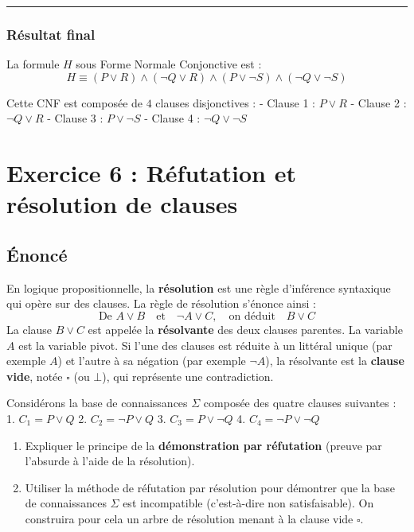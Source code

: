 \documentclass[11pt,a4paper]{article}
\begin{document}
\begin{center}\rule{0.5\linewidth}{0.5pt}\end{center}

\hypertarget{ruxe9sultat-final}{%
\subsubsection{Résultat final}\label{ruxe9sultat-final}}

La formule \(H\) sous Forme Normale Conjonctive est :
\[H \equiv (P \lor R) \land (\neg Q \lor R) \land (P \lor \neg S) \land (\neg Q \lor \neg S)\]

Cette CNF est composée de \(4\) clauses disjonctives : - Clause 1 :
\(P \lor R\) - Clause 2 : \(\neg Q \lor R\) - Clause 3 :
\(P \lor \neg S\) - Clause 4 : \(\neg Q \lor \neg S\)
\n
\hypertarget{exercice-6-ruxe9futation-et-ruxe9solution-de-clauses}{%
\section{Exercice 6 : Réfutation et résolution de
clauses}\label{exercice-6-ruxe9futation-et-ruxe9solution-de-clauses}}

\hypertarget{uxe9noncuxe9}{%
\subsection{Énoncé}\label{uxe9noncuxe9}}

En logique propositionnelle, la \textbf{résolution} est une règle
d'inférence syntaxique qui opère sur des clauses. La règle de résolution
s'énonce ainsi :
\[\text{De } A \lor B \quad \text{et} \quad \neg A \lor C, \quad \text{on déduit} \quad B \lor C\]
La clause \(B \lor C\) est appelée la \textbf{résolvante} des deux
clauses parentes. La variable \(A\) est la variable pivot. Si l'une des
clauses est réduite à un littéral unique (par exemple \(A\)) et l'autre
à sa négation (par exemple \(\neg A\)), la résolvante est la
\textbf{clause vide}, notée \(\square\) (ou \(\bot\)), qui représente
une contradiction.

Considérons la base de connaissances \(\Sigma\) composée des quatre
clauses suivantes : 1. \(C_1 = P \lor Q\) 2. \(C_2 = \neg P \lor Q\) 3.
\(C_3 = P \lor \neg Q\) 4. \(C_4 = \neg P \lor \neg Q\)

\begin{enumerate}
\def\labelenumi{\arabic{enumi}.}
\tightlist
\item
  Expliquer le principe de la \textbf{démonstration par réfutation}
  (preuve par l'absurde à l'aide de la résolution).
\item
  Utiliser la méthode de réfutation par résolution pour démontrer que la
  base de connaissances \(\Sigma\) est incompatible (c'est-à-dire non
  satisfaisable). On construira pour cela un arbre de résolution menant
  à la clause vide \(\square\).
\end{enumerate}
\end{document}
